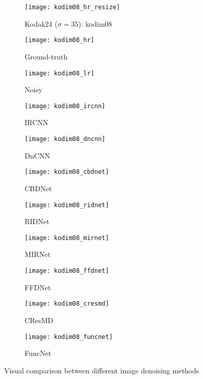 \documentclass{article}
\begin{document}
{\begin{figure}
\begin{minipage}{1\textwidth}
\begin{minipage}{0.30\textwidth}
\begin{subfigure}{0.98\columnwidth}
\texttt{[image: kodim08\_hr\_resize]}
\caption*{Kodak24 ($\sigma=35$): kodim08}
\end{subfigure}
\end{minipage}
\begin{minipage}{0.70\textwidth}
\begin{subfigure}{0.19\columnwidth}
\texttt{[image: kodim08\_hr]}
\caption*{Ground-truth}
\end{subfigure}
\begin{subfigure}{0.19\columnwidth}
\texttt{[image: kodim08\_lr]}
\caption*{Noisy}
\end{subfigure}
\begin{subfigure}{0.19\columnwidth}
\texttt{[image: kodim08\_ircnn]}
\caption*{IRCNN~\cite{zhang2017learning}}
\end{subfigure}
\begin{subfigure}{0.19\columnwidth}
\texttt{[image: kodim08\_dncnn]}
\caption*{DnCNN~\cite{zhang2017beyond}}
\end{subfigure}
\begin{subfigure}{0.19\columnwidth}
\texttt{[image: kodim08\_cbdnet]}
\caption*{CBDNet~\cite{guo2019toward}}
\end{subfigure}

\begin{subfigure}{0.19\columnwidth}
\texttt{[image: kodim08\_ridnet]}
\caption*{RIDNet~\cite{anwar2019real}}
\end{subfigure}
\begin{subfigure}{0.19\columnwidth}
\texttt{[image: kodim08\_mirnet]}
\caption*{MIRNet~\cite{zamir2020learning}}
\end{subfigure}
\begin{subfigure}{0.19\columnwidth}
\texttt{[image: kodim08\_ffdnet]}
\caption*{FFDNet~\cite{zhang2018ffdnet}}
\end{subfigure}
\begin{subfigure}{0.19\columnwidth}
\texttt{[image: kodim08\_cresmd]}
\caption*{CResMD~\cite{he2020interactive}}
\end{subfigure}
\begin{subfigure}{0.19\columnwidth}
\texttt{[image: kodim08\_funcnet]}
\caption*{FuncNet}
\end{subfigure}
\end{minipage}
\end{minipage}
\caption{Visual comparison between different image denoising methods}
\label{fig:3}
\bigskip


\end{figure}}
\end{document}
